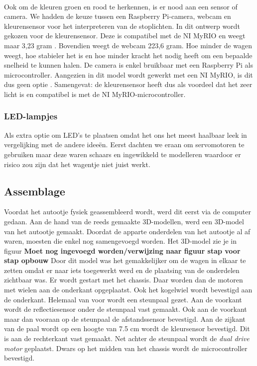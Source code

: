 \documentclass[a4paper,twoside,kulak]{kulakreport} %
\begin{document}
~

Ook om de kleuren groen en rood te herkennen, is er nood aan een sensor of camera. We hadden de keuze tussen een Raspberry Pi-camera, webcam en kleurensensor voor het interpreteren van de stoplichten. In dit ontwerp wordt gekozen voor de kleurensensor. Deze is compatibel met de NI MyRIO en weegt maar 3,23 gram \cite{Webcam,TCS34725KleurSensorBOB}. Bovendien weegt de webcam 223,6 gram. Hoe minder de wagen weegt, hoe stabieler het is en hoe minder kracht het nodig heeft om een bepaalde snelheid te kunnen halen. De camera is enkel bruikbaar met een Raspberry Pi als microcontroller. Aangezien in dit model wordt gewerkt met een NI MyRIO, is dit dus geen optie \cite{RPi-camera}. Samengevat: de kleurensensor heeft dus als voordeel dat het zeer licht is en compatibel is met de NI MyRIO-microcontroller.
\label{Sensoren}


\subsubsection{LED-lampjes}\label{LED-lampjes}
Als extra optie om LED's te plaatsen omdat het ons het meest haalbaar leek in vergelijking met de andere ideeën. Eerst dachten we eraan om servomotoren te gebruiken maar deze waren schaars en ingewikkeld te modelleren waardoor er risico zou zijn dat het wagentje niet juist werkt.


\subsection{Assemblage}
Voordat het autootje fysiek geassembleerd wordt, werd dit eerst via de computer gedaan. Aan de hand van de reeds gemaakte 3D-modellen, werd een 3D-model van het autootje gemaakt. Doordat de apparte onderdelen van het autootje al af waren, moesten die enkel nog samengevoegd worden. Het 3D-model zie je in figuur
{\bf{\Large Moet nog ingevoegd worden/verwijzing naar figuur stap voor stap opbouw}}
Door dit model was het gemakkelijker om de wagen in elkaar te zetten omdat er naar iets toegewerkt werd en de plaatsing van de onderdelen zichtbaar was. Er wordt gestart met het chassis. Daar worden dan de motoren met wielen aan de onderkant opgeplaatst. Ook het kogelwiel wordt bevestigd aan de onderkant. Helemaal van voor wordt een steunpaal gezet. Aan de voorkant wordt de reflectiesensor onder de steunpaal vast gemaakt. Ook aan de voorkant maar dan vooraan op de steunpaal de afstandssensor bevestigd. Aan de zijkant van de paal wordt op een hoogte van 7.5 cm wordt de kleursensor bevestigd. Dit is aan de rechterkant vast gemaakt. Net achter de steunpaal wordt de {\it dual drive motor} geplaatst. Dwars op het midden van het chassis wordt de microcontroller bevestigd.
\end{document}
